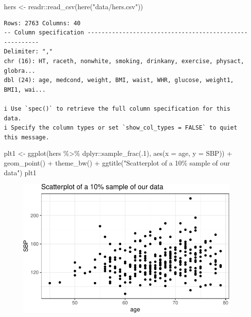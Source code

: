 \documentclass[
  letterpaper,
  DIV=11,
  numbers=noendperiod]{scrreport}
\newenvironment{Shaded}{\begin{snugshade}}{\end{snugshade}}
\newcommand{\AttributeTok}[1]{\textcolor[rgb]{0.40,0.45,0.13}{#1}}
\newcommand{\DecValTok}[1]{\textcolor[rgb]{0.68,0.00,0.00}{#1}}
\newcommand{\FunctionTok}[1]{\textcolor[rgb]{0.28,0.35,0.67}{#1}}
\newcommand{\NormalTok}[1]{\textcolor[rgb]{0.00,0.23,0.31}{#1}}
\newcommand{\OtherTok}[1]{\textcolor[rgb]{0.00,0.23,0.31}{#1}}
\newcommand{\SpecialCharTok}[1]{\textcolor[rgb]{0.37,0.37,0.37}{#1}}
\newcommand{\StringTok}[1]{\textcolor[rgb]{0.13,0.47,0.30}{#1}}
\begin{document}
\begin{Shaded}
\begin{Highlighting}[]
\NormalTok{hers }\OtherTok{\textless{}{-}}\NormalTok{ readr}\SpecialCharTok{::}\FunctionTok{read\_csv}\NormalTok{(}\FunctionTok{here}\NormalTok{(}\StringTok{"data/hers.csv"}\NormalTok{))}
\end{Highlighting}
\end{Shaded}

\begin{verbatim}
Rows: 2763 Columns: 40
-- Column specification --------------------------------------------------------
Delimiter: ","
chr (16): HT, raceth, nonwhite, smoking, drinkany, exercise, physact, globra...
dbl (24): age, medcond, weight, BMI, waist, WHR, glucose, weight1, BMI1, wai...

i Use `spec()` to retrieve the full column specification for this data.
i Specify the column types or set `show_col_types = FALSE` to quiet this message.
\end{verbatim}

\begin{Shaded}
\begin{Highlighting}[]
\NormalTok{plt1 }\OtherTok{\textless{}{-}} \FunctionTok{ggplot}\NormalTok{(hers }\SpecialCharTok{\%\textgreater{}\%}\NormalTok{ dplyr}\SpecialCharTok{::}\FunctionTok{sample\_frac}\NormalTok{(.}\DecValTok{1}\NormalTok{), }\FunctionTok{aes}\NormalTok{(}\AttributeTok{x =}\NormalTok{ age, }\AttributeTok{y =}\NormalTok{ SBP)) }\SpecialCharTok{+} 
  \FunctionTok{geom\_point}\NormalTok{() }\SpecialCharTok{+} 
  \FunctionTok{theme\_bw}\NormalTok{() }\SpecialCharTok{+} 
  \FunctionTok{ggtitle}\NormalTok{(}\StringTok{"Scatterplot of a 10\% sample of our data"}\NormalTok{) }
\NormalTok{plt1 }
\end{Highlighting}
\end{Shaded}

\begin{figure}[H]

{\centering \includegraphics{week1/week1_files/figure-pdf/unnamed-chunk-4-1.pdf}

}

\end{figure}
\end{document}
